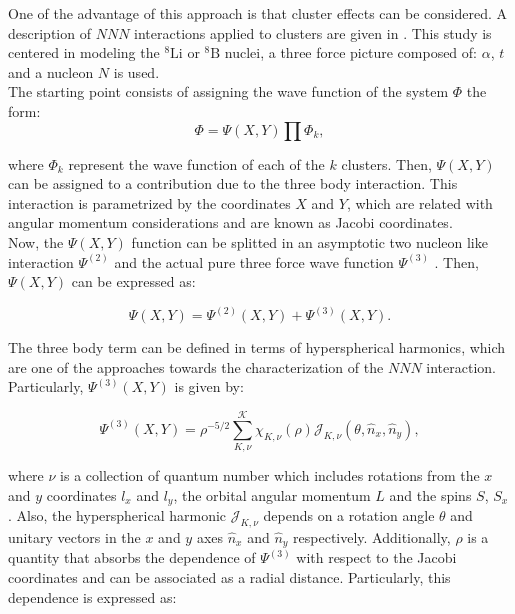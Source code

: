 \documentclass[openany]{book}
\begin{document}
One of the advantage of this approach is that cluster effects can be considered. A description of $NNN$ interactions applied to clusters are given in  \cite{grigorenko_danilin_efros_shulgina_zhukov_1998}. This study is centered in modeling the $\mathrm{{}^{8}Li}$ or $\mathrm{{}^{8}B}$ nuclei, a three force picture composed of: $\alpha$, $t$ and a nucleon $N$ is used.  \\

The starting point consists of assigning the wave function of the system  $\Phi$  the form:  \\

\begin{equation}\label{eq:micro_threeBody_wavefunction}
	\Phi = \Psi(X, Y) \prod \Phi_k, 
\end{equation}

where $\Phi_k$ represent the wave function of each of the $k$ clusters. Then, $\Psi(X, Y)$ can be assigned to a contribution due to the three body interaction. This interaction is parametrized by the coordinates $X$ and $Y$,  which are related with angular momentum considerations and are known as Jacobi coordinates. \\

Now, the $\Psi(X, Y)$ function can be splitted in an asymptotic two nucleon like interaction $\Psi^{(2)}$ and the actual pure three force wave function $\Psi^{(3)}$ . Then, $\Psi(X, Y)$ can be expressed as: 

\begin{equation}\label{eq:micro_threeBody_splitting}
	\Psi(X, Y) = \Psi^{(2)}(X, Y) +  \Psi^{(3)}(X, Y).
\end{equation}

The three body term can be defined in terms of hyperspherical harmonics, which are one of the approaches towards the characterization of the $NNN$ interaction. Particularly, $ \Psi^{(3)}(X, Y)$ is given by: 


\begin{equation}\label{eq:micro_threeBody_psi3}
	\Psi^{(3)}(X, Y) = \rho^{-5/2} \sum_{K, \nu}^{\mathcal{K}} {\chi_{K, \nu}(\rho) \mathcal{J}_{K, \nu} (\theta, {\hat n}_x, {\hat n}_y ) },
\end{equation}

where $\nu$ is a collection of quantum number which includes rotations from the $x$ and $y$ coordinates $l_x$ and $l_y$, the orbital angular momentum $L$ and the spins $S$, $S_x$. Also, the hyperspherical harmonic $\mathcal{J}_{K, \nu}$ depends on a rotation angle $\theta$ and unitary vectors in the $x$ and $y$ axes ${\hat n}_x$ and ${\hat n}_y$ respectively. Additionally, $\rho$ is a quantity that absorbs the dependence of $\Psi^{(3)}$  with respect to the Jacobi coordinates and can be associated as a radial distance.  Particularly, this dependence is expressed as: 
\end{document}
